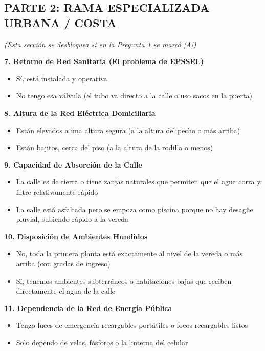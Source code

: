 \documentclass[12pt, letterpaper]{article}
\begin{document}
\subsection*{PARTE 2: RAMA ESPECIALIZADA URBANA / COSTA}
\textit{(Esta sección se desbloquea si en la Pregunta 1 se marcó [A])}

\textbf{7. Retorno de Red Sanitaria (El problema de EPSSEL)}
\begin{itemize}[label={}]
  \item [A] Sí, está instalada y operativa
  \item [B] No tengo esa válvula (el tubo va directo a la calle o uso sacos en la puerta)
\end{itemize}

\textbf{8. Altura de la Red Eléctrica Domiciliaria}
\begin{itemize}[label={}]
  \item [A] Están elevados a una altura segura (a la altura del pecho o más arriba)
  \item [B] Están bajitos, cerca del piso (a la altura de la rodilla o menos)
\end{itemize}

\textbf{9. Capacidad de Absorción de la Calle}
\begin{itemize}[label={}]
  \item [A] La calle es de tierra o tiene zanjas naturales que permiten que el agua corra y filtre relativamente rápido
  \item [B] La calle está asfaltada pero se empoza como piscina porque no hay desagüe pluvial, subiendo rápido a la vereda
\end{itemize}

\textbf{10. Disposición de Ambientes Hundidos}
\begin{itemize}[label={}]
  \item [A] No, toda la primera planta está exactamente al nivel de la vereda o más arriba (con gradas de ingreso)
  \item [B] Sí, tenemos ambientes subterráneos o habitaciones bajas que reciben directamente el agua de la calle
\end{itemize}

\textbf{11. Dependencia de la Red de Energía Pública}
\begin{itemize}[label={}]
  \item [A] Tengo luces de emergencia recargables portátiles o focos recargables listos
  \item [B] Solo dependo de velas, fósforos o la linterna del celular
\end{itemize}
\end{document}
